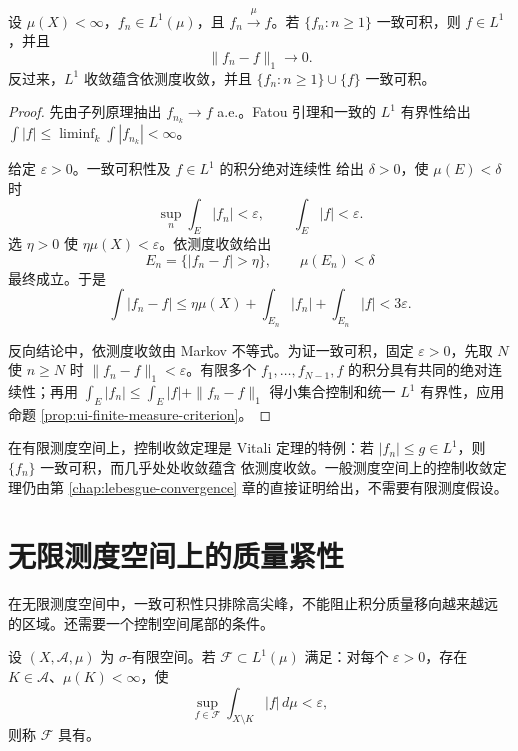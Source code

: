 \begin{theorem}[Vitali]
\label{thm:vitali-convergence}
设 \(\mu(X)<\infty\)，\(f_n\in L^1(\mu)\)，且
\(f_n\xrightarrow{\mu}f\)。若 \(\{f_n:n\ge1\}\) 一致可积，则
\(f\in L^1\)，并且
\[
 \|f_n-f\|_1\longrightarrow0.
\]
反过来，\(L^1\) 收敛蕴含依测度收敛，并且
\(\{f_n:n\ge1\}\cup\{f\}\) 一致可积。
\end{theorem}

\begin{proof}
先由子列原理抽出 \(f_{n_k}\to f\) a.e.。Fatou 引理和一致的
\(L^1\) 有界性给出
\(\int|f|\le\liminf_k\int|f_{n_k}|<\infty\)。

给定 \(\varepsilon>0\)。一致可积性及 \(f\in L^1\) 的积分绝对连续性
给出 \(\delta>0\)，使 \(\mu(E)<\delta\) 时
\[
 \sup_n\int_E|f_n|<\varepsilon,\qquad
 \int_E|f|<\varepsilon.
\]
选 \(\eta>0\) 使 \(\eta\mu(X)<\varepsilon\)。依测度收敛给出
\[
 E_n=\{|f_n-f|>\eta\},\qquad \mu(E_n)<\delta
\]
最终成立。于是
\[
 \int|f_n-f|
 \le\eta\mu(X)+\int_{E_n}|f_n|+\int_{E_n}|f|
 <3\varepsilon.
\]

反向结论中，依测度收敛由 Markov 不等式。为证一致可积，固定
\(\varepsilon>0\)，先取 \(N\) 使 \(n\ge N\) 时
\(\|f_n-f\|_1<\varepsilon\)。有限多个
\(f_1,\ldots,f_{N-1},f\) 的积分具有共同的绝对连续性；再用
\(\int_E|f_n|\le\int_E|f|+\|f_n-f\|_1\) 得小集合控制和统一
\(L^1\) 有界性，应用命题 \ref{prop:ui-finite-measure-criterion}。
\end{proof}

\begin{corollary}
在有限测度空间上，控制收敛定理是 Vitali 定理的特例：若
\(|f_n|\le g\in L^1\)，则 \(\{f_n\}\) 一致可积，而几乎处处收敛蕴含
依测度收敛。一般测度空间上的控制收敛定理仍由第
\ref{chap:lebesgue-convergence} 章的直接证明给出，不需要有限测度假设。
\end{corollary}

\section{无限测度空间上的质量紧性}

在无限测度空间中，一致可积性只排除高尖峰，不能阻止积分质量移向越来越远
的区域。还需要一个控制空间尾部的条件。

\begin{definition}
设 \((X,\mathcal A,\mu)\) 为 \(\sigma\)-有限空间。若
\(\mathcal F\subset L^1(\mu)\) 满足：对每个 \(\varepsilon>0\)，存在
\(K\in\mathcal A\)、\(\mu(K)<\infty\)，使
\[
 \sup_{f\in\mathcal F}\int_{X\setminus K}|f|\,d\mu<\varepsilon,
\]
则称 \(\mathcal F\) 具有。
\end{definition}

